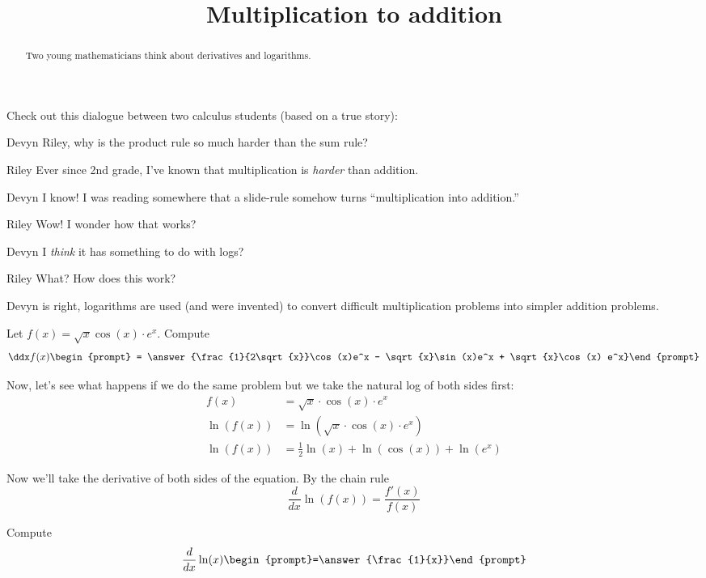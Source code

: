\documentclass{ximera}
\title[Break-Ground:]{Multiplication to addition}
\begin{document}
\begin{abstract}
Two young mathematicians think about derivatives and logarithms.
\end{abstract}
\maketitle


Check out this dialogue between two calculus students (based on a true
story):

\begin{dialogue}
\item[Devyn] Riley, why is the product rule so much harder than the sum rule?
\item[Riley] Ever since 2nd grade, I've known that multiplication is
  \textit{harder} than addition.
\item[Devyn] I know! I was reading somewhere that a slide-rule somehow
  turns ``multiplication into addition.''
\item[Riley] Wow! I wonder how that works?
\item[Devyn] I \textit{think} it has something to do with logs?
\item[Riley] What? How does this work?
\end{dialogue}

Devyn is right, logarithms are used (and were invented) to convert
difficult multiplication problems into simpler addition problems.

\begin{problem}
  Let $f(x) =  \sqrt{x} \cos(x) \cdot e^x$. Compute
  \[
  \ddx f(x)\begin{prompt} = \answer{\frac{1}{2\sqrt{x}}\cos(x)e^x -  \sqrt{x}\sin(x)e^x +  \sqrt{x}\cos(x) e^x}\end{prompt}
  \]
\end{problem}

Now, let's see what happens if we do the same problem but we take the
natural log of both sides first:
\begin{align*}
  f(x) &= \sqrt{x}\cdot\cos(x)\cdot e^x\\
  \ln(f(x)) &= \ln( \sqrt{x}\cdot\cos(x)\cdot e^x)\\
  \ln(f(x)) &=\frac{1}{2}\ln{(x)} + \ln(\cos(x)) + \ln(e^x)
\end{align*}

Now we'll take the derivative of both sides of the equation.
By the chain rule
\[
\frac{d}{dx} \ln(f(x))= \frac{f'(x)}{f(x)}
\]


\begin{problem}
  Compute %
  \[
  \frac{d}{dx} \ln(x)  \begin{prompt}=\answer{\frac{1}{x}}\end{prompt}
  \]
\end{problem}
\end{document}

